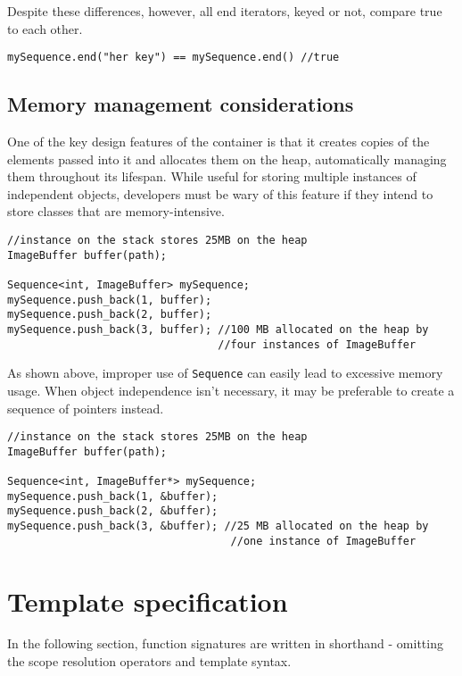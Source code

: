 ﻿\documentclass{article}
\begin{document}
Despite these differences, however, all end iterators, keyed or not, compare
true to each other.

\begin{verbatim}
mySequence.end("her key") == mySequence.end() //true
\end{verbatim}

\subsection{Memory management considerations}

One of the key design features of the container is that it creates copies
of the elements passed into it and allocates them on the heap, automatically
managing them throughout its lifespan. While useful for storing multiple
instances of independent objects, developers must be wary of this feature if
they intend to store classes that are memory-intensive.

\begin{verbatim}
//instance on the stack stores 25MB on the heap
ImageBuffer buffer(path);

Sequence<int, ImageBuffer> mySequence;
mySequence.push_back(1, buffer);
mySequence.push_back(2, buffer);
mySequence.push_back(3, buffer); //100 MB allocated on the heap by
                                 //four instances of ImageBuffer
\end{verbatim}

As shown above, improper use of {\tt Sequence} can easily lead to excessive
memory usage. When object independence isn't necessary, it may be preferable
to create a sequence of pointers instead.

\begin{verbatim}
//instance on the stack stores 25MB on the heap
ImageBuffer buffer(path);

Sequence<int, ImageBuffer*> mySequence;
mySequence.push_back(1, &buffer);
mySequence.push_back(2, &buffer);
mySequence.push_back(3, &buffer); //25 MB allocated on the heap by
                                   //one instance of ImageBuffer
\end{verbatim}

\section{Template specification}

In the following section, function signatures are written in shorthand -
omitting the scope resolution operators and template syntax.
\end{document}
